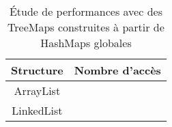 
\begin{table}[h]
  \centering
\begin{tabular}{|c|c|c|c|}
\hline
Structure & \multicolumn{3}{|c|}{Nombre d'accès}\\
\hline
ArrayList & & & \\
\hline
LinkedList & & & \\
\hline
\end{tabular}
\caption{Étude de performances avec des TreeMaps construites à partir de HashMaps globales} 
\label{tab:treehashmapglobal}
\end{table}

